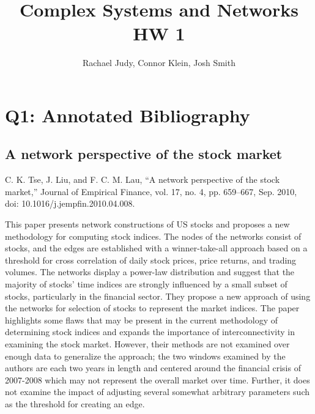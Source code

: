\documentclass[12pt]{article}
\title{Complex Systems and Networks HW 1}
\author{Rachael Judy, Connor Klein, Josh Smith}
\begin{document}
\pgfplotsset{compat=1.18}
 
\maketitle

\section{Q1: Annotated Bibliography}


\subsection{A network perspective of the stock market}
C. K. Tse, J. Liu, and F. C. M. Lau, “A network perspective of the stock market,” Journal of Empirical Finance, vol. 17, no. 4, pp. 659–667, Sep. 2010, doi: 10.1016/j.jempfin.2010.04.008.
\newline

This paper presents network constructions of US stocks and proposes a new methodology for computing stock indices. The nodes of the networks consist of stocks, and the edges are established with a winner-take-all approach based on a threshold for cross correlation of daily stock prices, price returns, and trading volumes. The networks display a power-law distribution and suggest that the majority of stocks' time indices are strongly influenced by a small subset of stocks, particularly in the financial sector. They propose a new approach of using the networks for selection of stocks to represent the market indices. The paper highlights some flaws that may be present in the current methodology of determining stock indices and expands the importance of interconnectivity in examining the stock market. However, their methods are not examined over enough data to generalize the approach; the two windows examined by the authors are each two years in length and centered around the financial crisis of 2007-2008 which may not represent the overall market over time. Further, it does not examine the impact of adjusting several somewhat arbitrary parameters such as the threshold for creating an edge.
\end{document}
